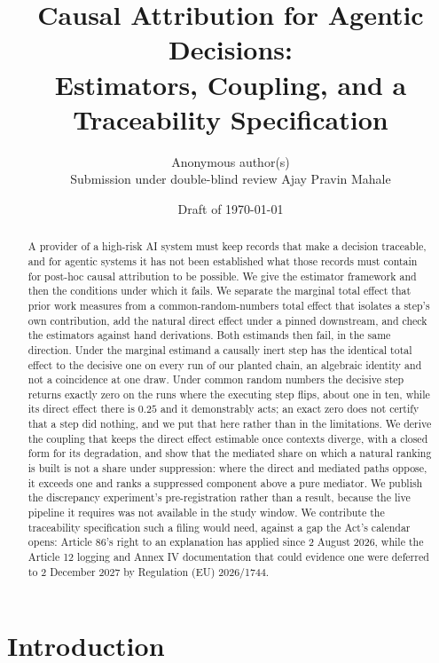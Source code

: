 \documentclass[11pt]{article}
\title{Causal Attribution for Agentic Decisions:\\
Estimators, Coupling, and a Traceability Specification}
\author{\ifanon Anonymous author(s)\\Submission under double-blind review%
        \else Ajay Pravin Mahale\fi}
\date{\ifanon\relax\else Draft of \today\fi}
\theoremstyle{remark}
\begin{document}
\maketitle

\begin{abstract}
A provider of a high-risk AI system must keep records that make a decision
traceable, and for agentic systems it has not been established what those
records must contain for post-hoc causal attribution to be possible. We give the
estimator framework and then the conditions under which it fails. We separate the
marginal total effect that prior work measures from a common-random-numbers total
effect that isolates a step's own contribution, add the natural direct effect
under a pinned downstream, and check the estimators against hand derivations.
Both estimands then fail, in the same direction. Under the marginal estimand a
causally inert step has the identical total effect to the decisive one on every
run of our planted chain, an algebraic identity and not a coincidence at one
draw. Under common random numbers the decisive step returns exactly zero on the
runs where the executing step flips, about one in ten, while its direct effect
there is $0.25$ and it demonstrably acts; an exact zero does not certify that a
step did nothing, and we put that here rather than in the limitations. We derive
the coupling that keeps the direct effect estimable once contexts diverge, with a
closed form for its degradation, and show that the mediated share on which a
natural ranking is built is not a share under suppression: where the direct and
mediated paths oppose, it exceeds one and ranks a suppressed component above a
pure mediator. We publish the discrepancy experiment's pre-registration rather
than a result, because the live pipeline it requires was not available in the
study window. We contribute the traceability specification such a filing would
need, against a gap the Act's calendar opens: Article 86's right to an
explanation has applied since 2 August 2026, while the Article 12 logging and
Annex IV documentation that could evidence one were deferred to 2 December 2027
by Regulation (EU) 2026/1744.
\end{abstract}

\section{Introduction}
\label{sec:intro}
\end{document}
